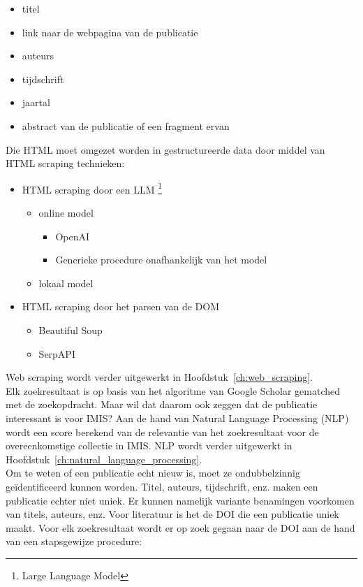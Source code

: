 \begin{itemize}
    \item titel
    \item link naar de webpagina van de publicatie
    \item auteurs
    \item tijdschrift
    \item jaartal
    \item abstract van de publicatie of een fragment ervan
\end{itemize}
Die HTML moet omgezet worden in gestructureerde data door middel van HTML scraping technieken:
\begin{itemize}
    \item HTML scraping door een LLM \footnote{Large Language Model}
    \begin{itemize}
        \item online model
        \begin{itemize}
            \item OpenAI
            \item Generieke procedure onafhankelijk van het model
        \end{itemize}
        \item lokaal model
    \end{itemize}
    \item HTML scraping door het parsen van de DOM
    \begin{itemize}
        \item Beautiful Soup
        \item SerpAPI
    \end{itemize}
\end{itemize}
Web scraping wordt verder uitgewerkt in Hoofdstuk~\ref{ch:web_scraping}.\\
Elk zoekresultaat is op basis van het algoritme van Google Scholar gematched met de zoekopdracht. Maar wil dat daarom ook zeggen dat de publicatie interessant is voor IMIS? Aan de hand van Natural Language Processing (NLP) wordt een score berekend van de relevantie van het zoekresultaat voor de overeenkomstige collectie in IMIS. NLP wordt verder uitgewerkt in Hoofdstuk~\ref{ch:natural_language_processing}.\\
Om te weten of een publicatie echt nieuw is, moet ze ondubbelzinnig geïdentificeerd kunnen worden. Titel, auteurs, tijdschrift, enz. maken een publicatie echter niet uniek. Er kunnen namelijk variante benamingen voorkomen van titels, auteurs, enz. Voor literatuur is het de DOI die een publicatie uniek maakt. Voor elk zoekresultaat wordt er op zoek gegaan naar de DOI aan de hand van een stapsgewijze procedure:
